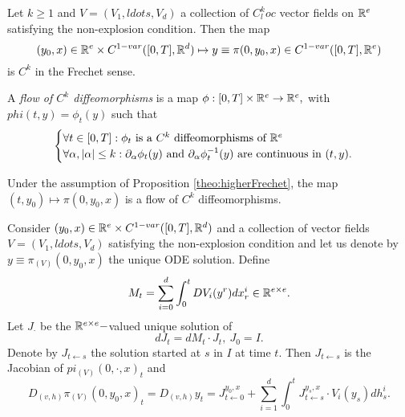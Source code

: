 \begin{proposition}\label{theo:higherFrechet}
    Let $k \geq 1$ and $V = (V_1,   ldots, V_d)$ a collection of $C^k_loc$ vector fields on $\mathbb{R}^e$ satisfying the non-explosion condition. Then the map
    \begin{equation}
        (y_0, x) \in \mathbb{R}^e \times C^{1-var}([0,T], \mathbb{R}^d) \mapsto y \equiv \pi(0, y_0, x) \in C^{1-var}([0,T], \mathbb{R}^e)
    \end{equation}
    is $C^k$ in the Frechet sense.
\end{proposition}

\begin{definition}
    A \textit{flow of $C^k$ diffeomorphisms} is a map $\phi:[0,T] \times \mathbb{R}^e \rightarrow \mathbb{R}^e,$ with $phi(t,y) = \phi_t(y)$ such that
    \begin{equation}
    \begin{cases}
        \forall t \in [0,T]: \phi_t \text{ is a } C^k \text{ diffeomorphisms of } \mathbb{R}^e \\
        \forall \alpha, |\alpha| \leq k: \partial_\alpha \phi_t(y) \text{ and } \partial_\alpha \phi_t^{-1}(y) \text{ are continuous in } (t,y).
    \end{cases}
    \end{equation}
\end{definition}

\begin{corollary}
    Under the assumption of Proposition \ref{theo:higherFrechet}, the map $(t,y_0) \mapsto \pi(0, y_0, x)$ is a flow of $C^k$ diffeomorphisms.  
\end{corollary}

\begin{proposition}
    Consider $(y_0, x) \in \mathbb{R}^e \times C^{1-var}([0,T], \mathbb{R}^d)$ and a collection of vector fields $V=(V_1,   ldots, V_d)$ satisfying the non-explosion condition and let us denote by $y \equiv \pi_{(V)}(0,y_0,x)$ the unique ODE solution. Define
    \begin{equation}
        M_t = \sum_{i=0}^d \int_0^t DV_i(y^r) dx^i_r \in \mathbb{R}^{e \times e}.
    \end{equation}
    Let $J_\cdot$ be the $\mathbb{R}^{e \times e}-$valued unique solution of 
    \begin{equation}
        dJ_t = dM_t \cdot J_t,\ J_0 = I.
    \end{equation}
    Denote by $J_{t \leftarrow s}$ the solution started at $s$ in $I$ at time $t.$
    Then $J_{t \leftarrow s}$ is the Jacobian of $pi_{(V)}(0, \cdot, x)_t$ and
    \begin{equation}
        D_{(v,h)} \pi_{(V)}(0, y_0, x)_t = D_{(v,h)} y_t = J^{y_0, x}_{t \leftarrow 0} + \sum_{i=1}^d \int_0^t J^{y_s, x}_{t \leftarrow s} \cdot V_i(y_s) dh_s^i.
    \end{equation}
\end{proposition}
